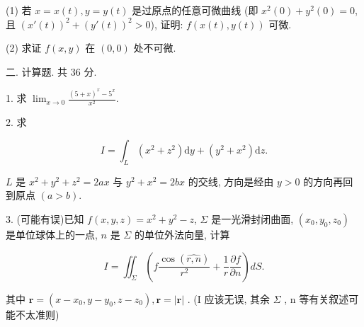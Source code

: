 \documentclass{examcollection}
\renewcommand{\displayformula}[1]{\[#1\]}
\begin{document}
{\begin{minipage}{\textwidth}
(1) 若 $x = x(t), y = y(t)$ 是过原点的任意可微曲线 (即 $x^{2}(0) + y^{2}(0) = 0$, 且 $(x'(t))^{2} + (y'(t))^{2} > 0$), 证明: $f(x(t), y(t))$ 可微.\par
(2) 求证 $f(x, y)$ 在 $(0, 0)$ 处不可微.\par
二. 计算题. 共 36 分.\par
1. 求 $\lim_{x\to 0}\frac{(5 + x)^x - 5^x}{x^2}.$\par
2. 求\par
\displayformula{I = \int_ {L} (x ^ {2} + z ^ {2}) \mathrm{d} y + (y ^ {2} + x ^ {2}) \mathrm{d} z.}\par
$L$ 是 $x^{2} + y^{2} + z^{2} = 2ax$ 与 $y^{2} + x^{2} = 2bx$ 的交线, 方向是经由 $y > 0$ 的方向再回到原点 $(a > b)$.\par
3. (可能有误)已知 $f(x, y, z) = x^2 + y^2 - z$, $\Sigma$ 是一光滑封闭曲面, $(x_0, y_0, z_0)$ 是单位球体上的一点, $n$ 是 $\Sigma$ 的单位外法向量, 计算\par
\displayformula{I = \iint_ {\Sigma} \left(f \frac {\cos (\widehat {r , n})}{r ^ {2}} + \frac {1}{r} \frac {\partial f}{\partial n}\right) d S.}\par
其中  $\boldsymbol{r}=(x-x_{0},y-y_{0},z-z_{0}),\boldsymbol{r}=|\boldsymbol{r}|$ . (I 应该无误, 其余  $\Sigma$ , n 等有关叙述可能不太准则)\par
\end{minipage}}
\ifdim\dimexpr\ht\proofbox+\dp\proofbox\relax>\textheight
\noindent\resizebox{!}{\textheight}{\usebox{\proofbox}}\else\noindent\usebox{\proofbox}\fi\clearpage
\end{document}
